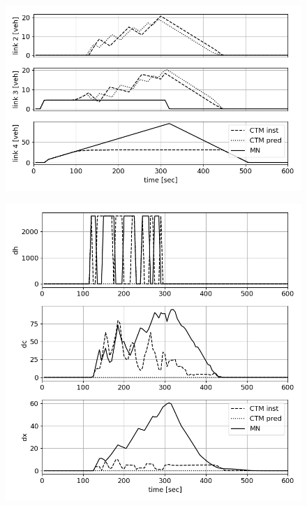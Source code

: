 \begin{figure}[h]
    \centering
    \includegraphics[width=\linewidth]{figs/ctm_vs_mn_x.png}
    \caption{\XXX }
    \label{fig:ctm_vs_mn_x}
\end{figure}

\begin{figure}[h]
    \centering
    \includegraphics[width=\linewidth]{figs/dist2ctm.png}
    \caption{\XXX }
    \label{fig:dist2ctm}
\end{figure}

